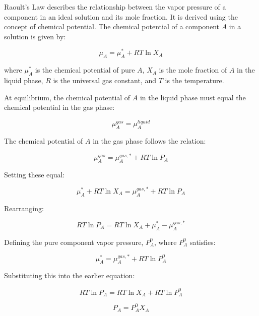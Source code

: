 \documentclass{article}
\theoremstyle{definition}
\begin{document}
Raoult's Law describes the relationship between the vapor pressure of a component in an ideal solution and its mole fraction. It is derived using the concept of chemical potential. The chemical potential of a component $A$ in a solution is given by:

\begin{equation}
\mu_A = \mu_A^* + RT \ln X_A
\end{equation}

where $\mu_A^*$ is the chemical potential of pure $A$, $X_A$ is the mole fraction of $A$ in the liquid phase, $R$ is the universal gas constant, and $T$ is the temperature.

At equilibrium, the chemical potential of $A$ in the liquid phase must equal the chemical potential in the gas phase:

\begin{equation}
\mu_A^{gas} = \mu_A^{liquid}
\end{equation}

The chemical potential of $A$ in the gas phase follows the relation:

\begin{equation}
\mu_A^{gas} = \mu_A^{gas,*} + RT \ln P_A
\end{equation}

Setting these equal:

\begin{equation}
\mu_A^* + RT \ln X_A = \mu_A^{gas,*} + RT \ln P_A
\end{equation}

Rearranging:

\begin{equation}
RT \ln P_A = RT \ln X_A + \mu_A^* - \mu_A^{gas,*}
\end{equation}

Defining the pure component vapor pressure, $P_A^0$, where $P_A^0$ satisfies:

\begin{equation}
\mu_A^* = \mu_A^{gas,*} + RT \ln P_A^0
\end{equation}

Substituting this into the earlier equation:

\begin{equation}
RT \ln P_A = RT \ln X_A + RT \ln P_A^0
\end{equation}

\begin{equation}
P_A = P_A^0 X_A
\end{equation}
\end{document}
